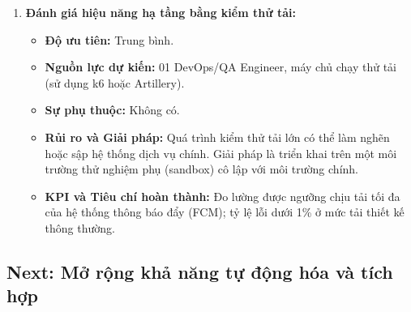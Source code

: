 \begin{enumerate}
    \item \textbf{Đánh giá hiệu năng hạ tầng bằng kiểm thử tải:}
    \begin{itemize}
        \item \textbf{Độ ưu tiên:} Trung bình.
        \item \textbf{Nguồn lực dự kiến:} 01 DevOps/QA Engineer, máy chủ chạy thử tải (sử dụng k6 hoặc Artillery).
        \item \textbf{Sự phụ thuộc:} Không có.
        \item \textbf{Rủi ro và Giải pháp:} Quá trình kiểm thử tải lớn có thể làm nghẽn hoặc sập hệ thống dịch vụ chính. Giải pháp là triển khai trên một môi trường thử nghiệm phụ (sandbox) cô lập với môi trường chính.
        \item \textbf{KPI và Tiêu chí hoàn thành:} Đo lường được ngưỡng chịu tải tối đa của hệ thống thông báo đẩy (FCM); tỷ lệ lỗi dưới 1\% ở mức tải thiết kế thông thường.
    \end{itemize}
\end{enumerate}

\subsection{Next: Mở rộng khả năng tự động hóa và tích hợp}

